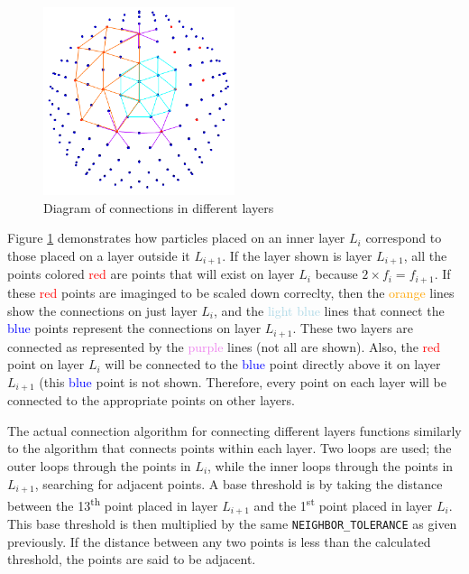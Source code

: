 \documentclass{article}
\begin{document}
\begin{figure}[h]
\centering
\includegraphics[width = 0.5\textwidth]{geodesic_sphere_diagram.png}
\caption{Diagram of connections in dif\mbox{f}erent layers}
\label{fig:layers}
\end{figure}


Figure \ref{fig:layers} demonstrates how particles placed on an inner layer $L_{i}$ correspond to those placed on a layer outside it $L_{i + 1}$. If the layer shown is layer $L_{i + 1}$, all the points colored \textcolor{red}{red} are points that will exist on layer $L_{i}$ because $2 \times f_{i} = f_{i + 1}$. If these \textcolor{red}{red} points are imaginged to be scaled down correclty, then the \textcolor{orange}{orange} lines show the connections on just layer $L_{i}$, and the \textcolor{lightblue}{light blue} lines that connect the \textcolor{blue}{blue} points represent the connections on layer $L_{i + 1}$. These two layers are connected as represented by the \textcolor{violet}{purple} lines (not all are shown). Also, the \textcolor{red}{red} point on layer $L_{i}$ will be connected to the \textcolor{blue}{blue} point directly above it on layer $L_{i + 1}$ (this \textcolor{blue}{blue} point is not shown. Therefore, every point on each layer will be connected to the appropriate points on other layers.

The actual connection algorithm for connecting dif\mbox{f}erent layers functions similarly to the algorithm that connects points within each layer. Two loops are used; the outer loops through the points in $L_{i}$, while the inner loops through the points in $L_{i + 1}$, searching for adjacent points. A base threshold is by taking the distance between the 13\textsuperscript{th} point placed in layer $L_{i + 1}$ and the 1\textsuperscript{st} point placed in layer $L_{i}$. This base threshold is then multiplied by the same \texttt{NEIGHBOR\_TOLERANCE} as given previously. If the distance between any two points is less than the calculated threshold, the points are said to be adjacent. 
\clearpage
\end{document}
